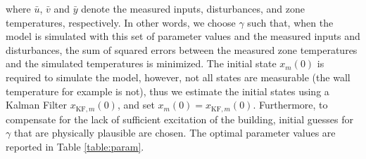 \noindent
where $\bar u$, $\bar v$ and $\bar y$ denote the measured inputs, disturbances, and zone temperatures, respectively. In other words, we choose $\gamma$ such that, when the model is simulated with this set of parameter values and the measured inputs and disturbances, the sum of squared errors between the measured zone temperatures and the simulated temperatures is minimized.
The initial state $x_m(0)$ is required to simulate the model, however, not all states are measurable (the wall temperature for example is not), thus we estimate the initial states using a Kalman Filter $x_{\text{KF},m}(0)$, and set  $x_m(0) = x_{\text{KF},m}(0)$.
Furthermore, to compensate for the lack of sufficient excitation of the building, initial guesses for $\gamma$ that are physically plausible are chosen. 
The optimal parameter values are reported in Table \ref{table:param}.

